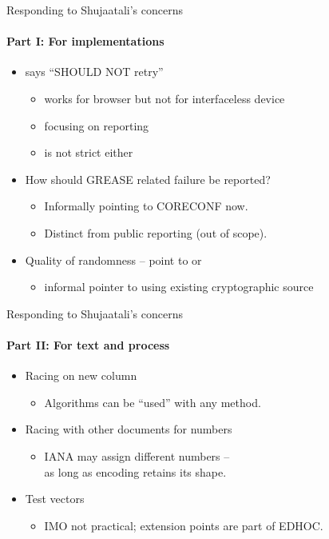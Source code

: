 \begin{frame}{Responding to Shujaatali's concerns}\Large
  \framesubtitle{Part I: For implementations}
  \begin{itemize}
    \item {} says ``SHOULD NOT retry''
      \begin{itemize}
        \item \Large works for browser but not for interfaceless device
        \item focusing on reporting
        \item {} is not strict either
      \end{itemize}
    \bigskip
    \item<2-> How should GREASE related failure be reported?
      \begin{itemize}
        \item \Large Informally pointing to CORECONF now.
        \item Distinct from public reporting (out of scope).
      \end{itemize}
    \bigskip
    \item<3-> Quality of randomness -- point to  or 
      \begin{itemize}
        \item \Large informal pointer to using existing cryptographic source
      \end{itemize}
  \end{itemize}
\end{frame}

\begin{frame}{Responding to Shujaatali's concerns}\Large
  \framesubtitle{Part II: For text and process}
  \begin{itemize}
    \item Racing  on new column
      \begin{itemize}
        \item \Large Algorithms can be ``used'' with any method.
      \end{itemize}
    \bigskip
    \item Racing with other documents for numbers
      \begin{itemize}
        \item \Large IANA may assign different numbers -- \\ as long as encoding retains its shape.
      \end{itemize}
    \bigskip
    \item Test vectors
      \begin{itemize}
        \item \Large IMO not practical; extension points are part of EDHOC.
      \end{itemize}
  \end{itemize}
\end{frame}

